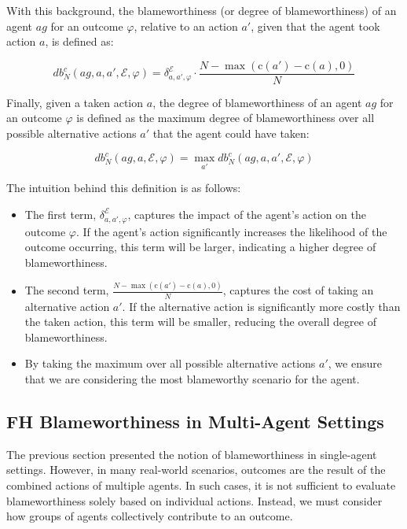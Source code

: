 \documentclass{article}
\begin{document}
With this background, the blameworthiness (or degree of blameworthiness) of an agent $ag$ for an outcome $\varphi$, relative to an action $a'$, given that the agent took action $a$, is defined as:

\begin{equation}
  db^c_N(ag, a, a', \mathcal{E}, \varphi) = \delta^\mathcal{E}_{a,a',\varphi} \cdot \frac{N - \max (\text{c}(a') - \text{c}(a), 0)}{N}
\label{eq:blameworthiness_single_agent}
\end{equation}

Finally, given a taken action $a$, the degree of blameworthiness of an agent $ag$ for an outcome $\varphi$ is defined as the maximum degree of blameworthiness over all possible alternative actions $a'$ that the agent could have taken: 

\begin{equation}
  db^c_N(ag, a, \mathcal{E}, \varphi) = \max_{a'} db^c_N(ag, a, a', \mathcal{E}, \varphi)
\label{eq:blameworthiness_max}
\end{equation}

The intuition behind this definition is as follows:

\begin{itemize}
  \item The first term, $\delta^\mathcal{E}_{a,a',\varphi}$, captures the impact of the agent's action on the outcome $\varphi$. If the agent's action significantly increases the likelihood of the outcome occurring, this term will be larger, indicating a higher degree of blameworthiness.
  \item The second term, $\frac{N - \max (\text{c}(a') - \text{c}(a), 0)}{N}$, captures the cost of taking an alternative action $a'$. If the alternative action is significantly more costly than the taken action, this term will be smaller, reducing the overall degree of blameworthiness.
  \item By taking the maximum over all possible alternative actions $a'$, we ensure that we are considering the most blameworthy scenario for the agent.
\end{itemize}

\subsection{FH Blameworthiness in Multi-Agent Settings}

The previous section presented the notion of blameworthiness in single-agent settings. However, in many real-world scenarios, outcomes are the result of the combined actions of multiple agents. In such cases, it is not sufficient to evaluate blameworthiness solely based on individual actions. Instead, we must consider how groups of agents collectively contribute to an outcome.
\end{document}
